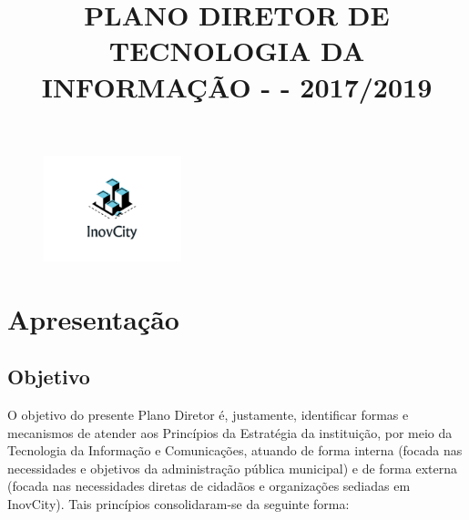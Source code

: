 \documentclass[        
    a4paper,          %
    12pt,             %
    chapter=TITLE,    %
    section=Title,    %
    subsection=Title, %
    oneside,          %
    english,          %
    spanish,          %
    brazil,           %
    sumario=abnt-6027-2012,
]{abntex2}
\title{PLANO DIRETOR DE TECNOLOGIA DA INFORMAÇÃO - \MakeUppercase{\EMPRESA{}} - 2017/2019}
\newcommand{\CIDADE}{InovCity}
\begin{document}
 

\maketitle

\vfill
\begin{figure}[!ht]
    \centering
    \includegraphics[width=4cm]{figuras/logo.png}
\end{figure}
\vfill    
\vfill

\newpage

\begin{table}[h]
\end{table}

\begin{KeepFromToc}
  \tableofcontents
\end{KeepFromToc}

\section{Apresenta\c{c}\~ao}

\subsection{Objetivo}
O objetivo do presente Plano Diretor é, justamente, identificar formas e mecanismos de atender aos Princípios da Estratégia da 
institui\c{c}\~ao, por meio da Tecnologia da Informação e Comunicações, atuando de forma interna (focada nas necessidades e objetivos da 
administração pública municipal) e de forma externa (focada nas necessidades diretas de cidadãos e organizações sediadas em \CIDADE). Tais 
princípios consolidaram-se da seguinte forma:
\end{document}
